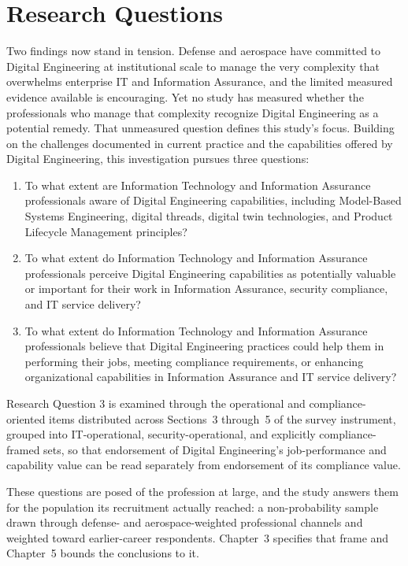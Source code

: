\section{Research Questions}

Two findings now stand in tension. Defense and aerospace have committed to Digital Engineering at institutional scale to manage the very complexity that overwhelms enterprise IT and Information Assurance, and the limited measured evidence available is encouraging. Yet no study has measured whether the professionals who manage that complexity recognize Digital Engineering as a potential remedy. That unmeasured question defines this study's focus. Building on the challenges documented in current practice and the capabilities offered by Digital Engineering, this investigation pursues three questions:

\begin{enumerate}
  \item To what extent are Information Technology and Information Assurance professionals aware of Digital Engineering capabilities, including Model-Based Systems Engineering, digital threads, digital twin technologies, and Product Lifecycle Management principles?

  \item To what extent do Information Technology and Information Assurance professionals perceive Digital Engineering capabilities as potentially valuable or important for their work in Information Assurance, security compliance, and IT service delivery?

  \item To what extent do Information Technology and Information Assurance professionals believe that Digital Engineering practices could help them in performing their jobs, meeting compliance requirements, or enhancing organizational capabilities in Information Assurance and IT service delivery?
\end{enumerate}

Research Question 3 is examined through the operational and compliance-oriented items distributed across Sections~3 through~5 of the survey instrument, grouped into IT-operational, security-operational, and explicitly compliance-framed sets, so that endorsement of Digital Engineering's job-performance and capability value can be read separately from endorsement of its compliance value.

These questions are posed of the profession at large, and the study answers them for the population its recruitment actually reached: a non-probability sample drawn through defense- and aerospace-weighted professional channels and weighted toward earlier-career respondents. Chapter~3 specifies that frame and Chapter~5 bounds the conclusions to it.

